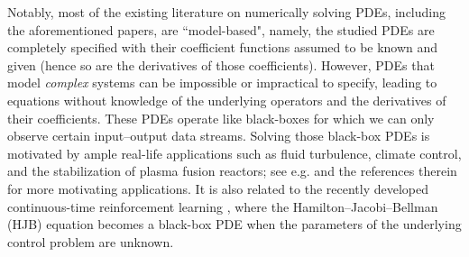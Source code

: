\documentclass[twoside,11pt]{article}
\newcommand{\1}{\mathbf{1}}
\def\ora#1{{\color{orange}#1}}
\numberwithin{equation}{section}
\begin{document}

Notably, most of the existing literature on numerically solving PDEs, including the aforementioned papers, are ``model-based", namely, the studied PDEs are completely specified with their coefficient functions assumed to be known and given (hence so are the derivatives of those coefficients). However, PDEs that model {\it complex}  systems
can be impossible or impractical to specify, leading to equations without knowledge of the underlying operators and the  derivatives of their coefficients. These PDEs operate like black-boxes for which we can only observe certain input--output data streams.
Solving those black-box PDEs is motivated by ample real-life applications such as fluid turbulence, climate control, and the stabilization of plasma fusion reactors; see e.g. \cite{li2020fourier,jiao2021one,lagergren2020learning} and the references therein for more motivating applications. It is also related to the recently developed continuous-time reinforcement learning \citep{wang2020reinforcement,jia2022policy,jia2022pg,jia2022q}, where the Hamilton--Jacobi--Bellman (HJB) equation becomes a black-box PDE when the parameters of the underlying control problem are unknown.
\end{document}
